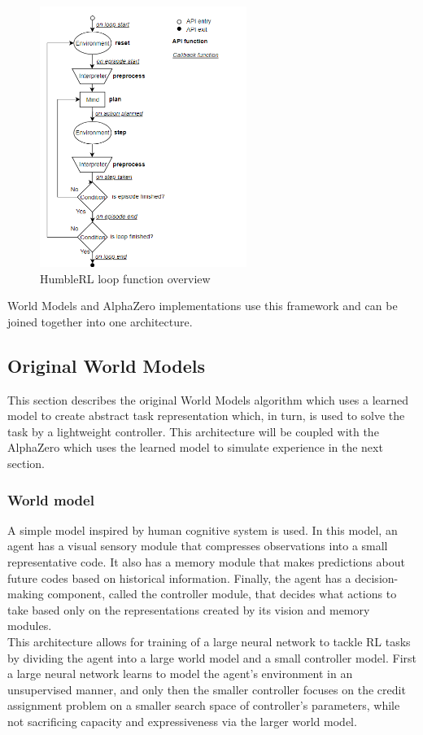\begin{figure}[H]
\includegraphics[width=0.6\textwidth,keepaspectratio]{figures/HumbleRL/loop.png}
\caption{HumbleRL loop function overview}
\label{Fig.HRL_loop}
\end{figure}

World Models and AlphaZero implementations use this framework and can be joined together into one architecture.

\subsection{Original World Models}

This section describes the original World Models \cite{Algo.WorldModels} algorithm which uses a learned model to create abstract task representation which, in turn, is used to solve the task by a lightweight controller. This architecture will be coupled with the AlphaZero which uses the learned model to simulate experience in the next section.

\subsubsection{World model}

A simple model inspired by human cognitive system is used. In this model, an agent has a visual sensory module that compresses observations into a small representative code. It also has a memory module that makes predictions about future codes based on historical information. Finally, the agent has a decision-making component, called the controller module, that decides what actions to take based only on the representations created by its vision and memory modules. \\
This architecture allows for training of a large neural network to tackle RL tasks by dividing the agent into a large world model and a small controller model. First a large neural network learns to model the agent’s environment in an unsupervised manner, and only then the smaller controller focuses on the credit assignment problem on a smaller search space of controller's parameters, while not sacrificing capacity and expressiveness via the larger world model.

